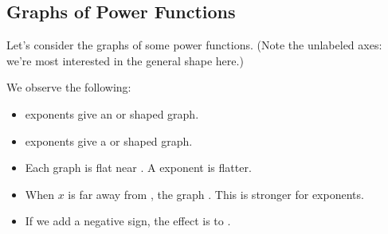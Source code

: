 \subsection{Graphs of Power Functions} 
Let's consider the graphs of some power functions. (Note the unlabeled axes: we're most interested in the general shape here.)
\begin{center}\end{center}
We observe the following:
\begin{itemize}
\item \makeblank[.75in] exponents give an \makeblanksmall or \makeblanksmall shaped graph.
\item \makeblank[.75in] exponents give a \makeblanksmall or \makeblanksmall shaped graph.
\item Each graph is flat near \blankpair. A \makeblank[1in] exponent is flatter.
\item When $x$ is far away from \makeblanksmall, the graph \makeblank. This is stronger for \makeblank[1in] exponents.
\item If we add a negative sign, the effect is to \makeblank.
\end{itemize}
